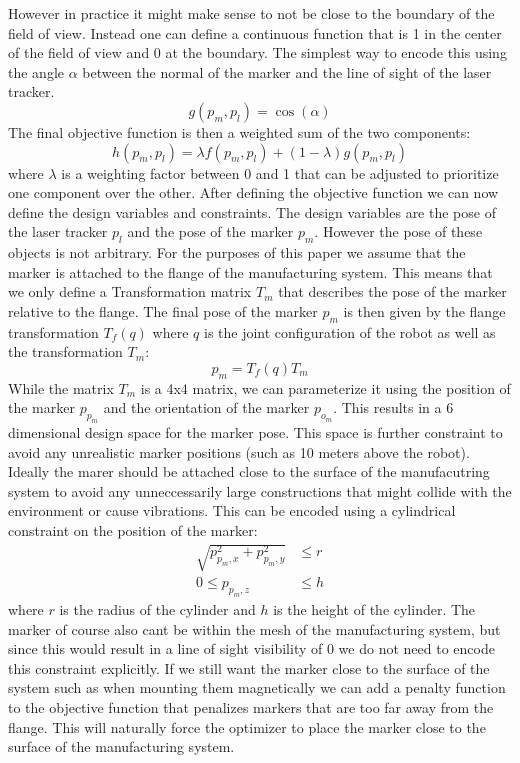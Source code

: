\documentclass{svproc}
\begin{document}
However in practice it might make sense to not be close to the boundary of the field of view.
Instead one can define a continuous function that is 1 in the center of the field of view and 0 at the boundary.
The simplest way to encode this using the angle $\alpha$ between the normal of the marker and the line of sight of the laser tracker.
\begin{equation}
    g(p_m,p_l) = \cos(\alpha)
\end{equation}
The final objective function is then a weighted sum of the two components:
\begin{equation}
    h(p_m,p_l) = \lambda f(p_m,p_l) + (1-\lambda) g(p_m,p_l)
    \label{eq:objective}
\end{equation}
where $\lambda$ is a weighting factor between 0 and 1 that can be adjusted to prioritize one component over the other.
After defining the objective function we can now define the design variables and constraints.
The design variables are the pose of the laser tracker $p_l$ and the pose of the marker $p_m$.
However the pose of these objects is not arbitrary.
For the purposes of this paper we assume that the marker is attached to the flange of the manufacturing system.
This means that we only define a Transformation matrix $T_{m}$ that describes the pose of the marker relative to the flange.
The final pose of the marker $p_m$ is then given by the flange transformation $T_{f}(q)$ where $q$ is the joint configuration of the robot as well as the transformation $T_{m}$:
\begin{equation}
    p_m = T_{f}(q)T_{m}
\end{equation}
While the matrix $T_m$ is a 4x4 matrix, we can parameterize it using the position of the marker $p_{p_m}$ and the orientation of the marker $p_{o_m}$.
This results in a 6 dimensional design space for the marker pose.
This space is further constraint to avoid any unrealistic marker positions (such as 10 meters above the robot).
Ideally the marer should be attached close to the surface of the manufacutring system to avoid any unneccessarily large constructions that might collide with the environment or cause vibrations.
This can be encoded using a cylindrical constraint on the position of the marker:
\begin{equation}
        \begin{split}
    \sqrt{p_{p_m,x}^2 + p_{p_m,y}^2} &\leq r \\
        0 \leq p_{p_m,z} &\leq h
        \end{split}
\end{equation}
where $r$ is the radius of the cylinder and $h$ is the height of the cylinder.
The marker of course also cant be within the mesh of the manufacturing system, but since this would result in a line of sight visibility of 0 we do not need to encode this constraint explicitly.
If we still want the marker close to the surface of the system such as when mounting them magnetically we can add a penalty function to the objective function that penalizes markers that are too far away from the flange.
This will naturally force the optimizer to place the marker close to the surface of the manufacturing system.
\end{document}

